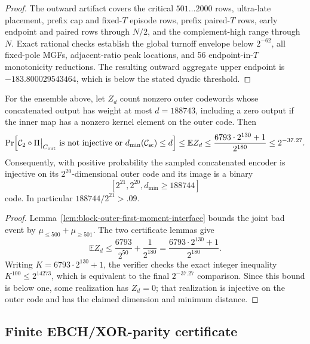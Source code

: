 \begin{proof}
The outward artifact covers the critical \(501\ldots2000\) rows, ultra-late
placement, prefix cap and fixed-\(T\) episode rows, prefix paired-\(T\) rows,
early endpoint and paired rows through \(N/2\), and the complement-high range
through \(N\).  Exact rational checks establish the global turnoff envelope
below \(2^{-62}\), all fixed-pole MGFs, adjacent-ratio peak locations, and 56
endpoint-in-\(T\) monotonicity reductions.  The resulting outward aggregate
upper endpoint is \(-183.800029543464\), which is below the stated dyadic
threshold.
\end{proof}

\begin{theorem}
\label{thm:fullsplit-rm-finite-certificate-009}
For the ensemble above, let \(Z_d\) count nonzero outer codewords whose
concatenated output has weight at most \(d=188743\), including a zero output if
the inner map has a nonzero kernel element on the outer code.  Then
\[
\Pr\Bigl[
 {\mathcal{C}_2}\circ\Pi\big|_{C_{\rm out}}\text{ is not injective}
 \ \text{or}\ d_{\min}({\mathcal{C}_{\mathsf{sc}}})\le d
\Bigr]
\le \mathbb E Z_d
\le \frac{6793\cdot2^{130}+1}{2^{180}}
\le 2^{-37.27}.
\]
Consequently, with positive probability the sampled concatenated encoder is
injective on its \(2^{20}\)-dimensional outer code and its image is a binary
\[
 [2^{21},2^{20},d_{\min}\ge188744]
\]
code.  In particular \(188744/2^{21}>.09\).
\end{theorem}

\begin{proof}
Lemma~\ref{lem:block-outer-first-moment-interface} bounds the joint bad event by
\(\mu_{\le500}+\mu_{\ge501}\).  The two certificate lemmas give
\[
 \mathbb E Z_d
 \le \frac{6793}{2^{50}}+\frac1{2^{180}}
 =\frac{6793\cdot2^{130}+1}{2^{180}}.
\]
Writing \(K=6793\cdot2^{130}+1\), the verifier checks the exact integer
inequality \(K^{100}\le2^{14273}\), which is equivalent to the final
\(2^{-37.27}\) comparison.  Since this bound is below one, some realization has
\(Z_d=0\); that realization is injective on the outer code and has the claimed
dimension and minimum distance.
\end{proof}

\subsection{Finite EBCH/XOR-parity certificate}
\label{sec:ebch-xor-parity-finite-certificate}

